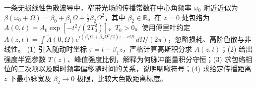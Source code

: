 一条无损线性色散波导中，窄带光场的传播常数在中心角频率 \(\omega_0\) 附近近似为 \(\beta(\omega_0+\Omega)=\beta_0+\beta_1\Omega+\tfrac12\beta_2\Omega^2\)，其中 \(\beta_2\in\mathbb R\)。在 \(z=0\) 处包络为 \(A(0,t)=A_0\exp[-t^2/(2T_0^2)]\)，\(T_0>0\)。使用傅里叶约定 \(A(z,t)=\int\tilde A(0,\Omega)e^{i(\beta_1\Omega+\beta_2\Omega^2/2)z-i\Omega t}\,d\Omega/(2\pi)\)，忽略损耗、高阶色散与非线性。
(1) 引入随动时坐标 \(\tau=t-\beta_1z\)，严格计算高斯积分求 \(A(z,t)\)；(2) 给出强度半宽参数 \(T(z)\)、峰值强度比例，解释为何脉冲能量积分守恒；(3) 求包络相位的二次项以及瞬时频率偏移随时间的关系，说明啁啾符号；(4) 求给定传播距离 \(z\) 下最小脉宽及 \(\beta_2\to0\) 极限，比较大色散距离标度。
